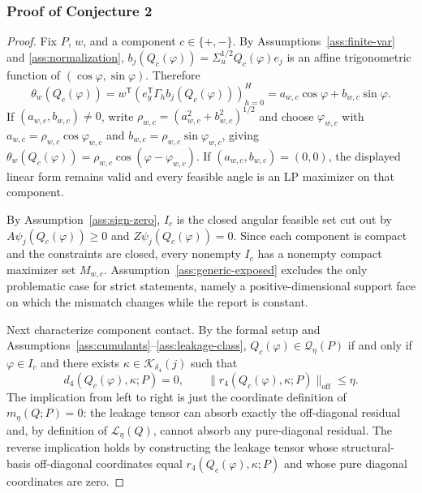 \documentclass[11pt]{article}
\newcommand{\transpose}{\mathsf{T}}
\theoremstyle{definition}
\theoremstyle{plain}
\theoremstyle{remark}
\begin{document}
\subsubsection*{Proof of Conjecture 2}
\begin{proof}
Fix \(P\), \(w\), and a component \(c\in\{+,-\}\).  By Assumptions~\ref{ass:finite-var} and \ref{ass:normalization}, \(b_j(Q_c(\varphi))=\Sigma_u^{1/2}Q_c(\varphi)e_j\) is an affine trigonometric function of \((\cos\varphi,\sin\varphi)\).  Therefore
\[
\theta_w(Q_c(\varphi))
=w^\transpose\left(e_y^\transpose\Gamma_h b_j(Q_c(\varphi))\right)_{h=0}^H
=a_{w,c}\cos\varphi+b_{w,c}\sin\varphi .
\]
If \((a_{w,c},b_{w,c})\ne0\), write \(\rho_{w,c}=(a_{w,c}^2+b_{w,c}^2)^{1/2}\) and choose \(\varphi_{w,c}\) with \(a_{w,c}=\rho_{w,c}\cos\varphi_{w,c}\) and \(b_{w,c}=\rho_{w,c}\sin\varphi_{w,c}\), giving \(\theta_w(Q_c(\varphi))=\rho_{w,c}\cos(\varphi-\varphi_{w,c})\).  If \((a_{w,c},b_{w,c})=(0,0)\), the displayed linear form remains valid and every feasible angle is an LP maximizer on that component.

By Assumption~\ref{ass:sign-zero}, \(I_c\) is the closed angular feasible set cut out by \(A\psi_j(Q_c(\varphi))\ge0\) and \(Z\psi_j(Q_c(\varphi))=0\).  Since each component is compact and the constraints are closed, every nonempty \(I_c\) has a nonempty compact maximizer set \(M_{w,c}\).  Assumption~\ref{ass:generic-exposed} excludes the only problematic case for strict statements, namely a positive-dimensional support face on which the mismatch changes while the report is constant.

Next characterize component contact.  By the formal setup and Assumptions~\ref{ass:cumulants}--\ref{ass:leakage-class}, \(Q_c(\varphi)\in\mathcal Q_\eta(P)\) if and only if \(\varphi\in I_c\) and there exists \(\kappa\in\mathcal K_{\delta_4}(j)\) such that
\[
d_4(Q_c(\varphi),\kappa;P)=0,
\qquad
\|r_4(Q_c(\varphi),\kappa;P)\|_{\mathrm{off}}\le\eta .
\]
The implication from left to right is just the coordinate definition of \(m_\eta(Q;P)=0\): the leakage tensor can absorb exactly the off-diagonal residual and, by definition of \(\mathcal L_\eta(Q)\), cannot absorb any pure-diagonal residual.  The reverse implication holds by constructing the leakage tensor whose structural-basis off-diagonal coordinates equal \(r_4(Q_c(\varphi),\kappa;P)\) and whose pure diagonal coordinates are zero.


\end{proof}
\end{document}
